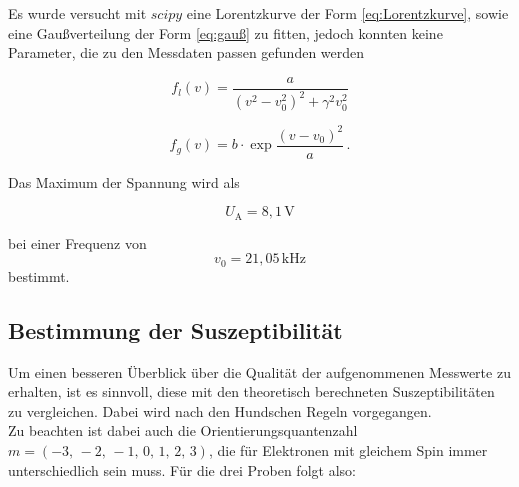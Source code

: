 Es wurde versucht mit $ scipy$ eine Lorentzkurve der Form \eqref{eq:Lorentzkurve}, sowie eine Gaußverteilung der Form \eqref{eq:gauß} zu fitten, jedoch konnten keine Parameter, die zu den Messdaten passen gefunden werden

\begin{equation}
    f_l(v) = \frac{a}{(v^2-v_0^2)^2 + {\gamma}^2 v_0^2}
    \label{eq:Lorentzkurve}
\end{equation}

\begin{equation}
    f_g(v) = b \cdot \exp{\frac{(v-v_0)^2}{a}} \,.
    \label{eq:gauß}
\end{equation} 

Das Maximum der Spannung wird als

\begin{equation}
    U_\text{A} = 8,1 \, \unit{\volt}
\end{equation}

bei einer Frequenz von 
\begin{equation}
    v_0 = 21,05 \, \unit{\kilo\hertz}
\end{equation}
bestimmt.

\subsection{Bestimmung der Suszeptibilität}

Um einen besseren Überblick über die Qualität der aufgenommenen Messwerte zu erhalten, ist es sinnvoll, diese mit den theoretisch berechneten Suszeptibilitäten zu vergleichen.
Dabei wird nach den Hundschen Regeln vorgegangen. \\

Zu beachten ist dabei auch die Orientierungsquantenzahl $m = (-3, \,-2, \,-1, \,0, \,1, \,2, \,3)$, die für Elektronen mit gleichem Spin immer unterschiedlich sein muss.
Für die drei Proben folgt also:

